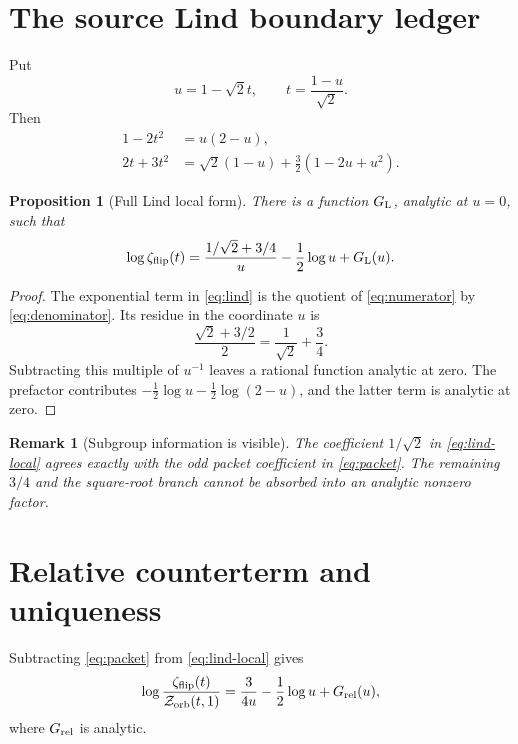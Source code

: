 \documentclass[11pt]{article}
\newtheorem{proposition}[theorem]{Proposition}
\newtheorem{remark}[theorem]{Remark}
\newcommand{\Zorb}{\mathcal Z_{\rm orb}}
\newcommand{\zflip}{\zeta_{\rm flip}}
\begin{document}
\section{The source Lind boundary ledger}

Put
\begin{equation}\label{eq:u}
 u=1-\sqrt2t,\qquad t=\frac{1-u}{\sqrt2}.
\end{equation}
Then
\begin{align}
 1-2t^2&=u(2-u),\label{eq:denominator}\\
 2t+3t^2
 &=\sqrt2(1-u)+\frac32(1-2u+u^2).\label{eq:numerator}
\end{align}

\begin{proposition}[Full Lind local form]\label{prop:lind-local}
There is a function $G_{\rm L}$, analytic at $u=0$, such that
\begin{equation}\label{eq:lind-local}
 \log\zflip(t)=
 \frac{1/\sqrt2+3/4}{u}-\frac12\log u+G_{\rm L}(u).
\end{equation}
\end{proposition}

\begin{proof}
The exponential term in \eqref{eq:lind} is the quotient of
\eqref{eq:numerator} by \eqref{eq:denominator}.  Its residue in the coordinate
$u$ is
\[
 \frac{\sqrt2+3/2}{2}=\frac1{\sqrt2}+\frac34.
\]
Subtracting this multiple of $u^{-1}$ leaves a rational function analytic at
zero.  The prefactor contributes
$-\frac12\log u-\frac12\log(2-u)$, and the latter term is analytic at zero.
\end{proof}

\begin{remark}[Subgroup information is visible]
The coefficient $1/\sqrt2$ in \eqref{eq:lind-local} agrees exactly with the
odd packet coefficient in \eqref{eq:packet}.  The remaining $3/4$ and the
square-root branch cannot be absorbed into an analytic nonzero factor.
\end{remark}

\section{Relative counterterm and uniqueness}

Subtracting \eqref{eq:packet} from \eqref{eq:lind-local} gives
\begin{equation}\label{eq:relative-log}
 \log\frac{\zflip(t)}{\Zorb(t,1)}
 =\frac{3}{4u}-\frac12\log u+G_{\rm rel}(u),
\end{equation}
where $G_{\rm rel}$ is analytic.
\end{document}
